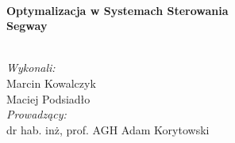 \begin{titlepage}
\HRule \\[0.4cm]
{ \huge \bfseries Optymalizacja w Systemach Sterowania\\[1cm]Segway}\\[0.4cm] %
\HRule \\[3.5cm]
 






\begin{flushleft}
\Large
\emph{Wykonali:}\\
Marcin Kowalczyk\\
Maciej Podsiadło\\[1cm]

 \emph{Prowadzący:}\\
dr hab. inż, prof. AGH Adam Korytowski\\[3cm] %
 
\end{flushleft}
\end{titlepage}
\clearpage
\setcounter{page}{2}